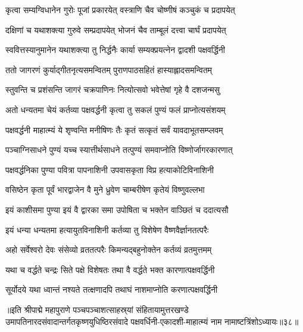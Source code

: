 \twolineshloka
{कृत्वा सम्यग्विधानेन गुरोः पूजां प्रकारयेत्}
{वस्त्राणि चैव चोष्णीषं कञ्चुकं च प्रदापयेत्}%

\twolineshloka
{दक्षिणां च यथाशक्त्या गुरुवे सम्प्रदापयेत् }
{भोजनं चैव ताम्बूलं दत्त्वा चार्घं प्रदापयेत्}%

\twolineshloka
{स्ववित्तस्यानुमानेन यथाशक्त्या तु निर्द्धनैः}
{कार्या सम्यक्प्रयत्नेन द्वादशी पक्षवर्द्धिनी}%

\twolineshloka
{ततो जागरणं कुर्याद्गीतनृत्यसमन्वितम्}
{पुराणपाठसहितं हास्याह्लादसमन्वितम्}%

\twolineshloka
{स्तुवन्ति च प्रशंसन्ति जागरं चक्रपाणिनः}
{नित्योत्सवो भवेत्तेषां गृहे वै दशजन्मसु}%

\twolineshloka
{अतो धन्यतमा चेयं कर्तव्या पक्षवर्द्धनी}
{कृत्वा तु सकलं पुण्यं फलं प्राप्नोत्यसंशयम्}%

\twolineshloka
{पक्षवर्द्धनी माहात्म्यं ये शृण्वन्ति मनीषिणः}
{तैः कृतं सत्कृतं सर्वं यावदाभूतसम्प्लवम्}%

\twolineshloka
{पञ्चाग्निसाधने पुण्यं यच्च स्यात्तीर्थसाधने}
{तत्पुण्यं समवाप्नोति विष्णोर्जागरकारणात्}%

\twolineshloka
{पक्षवर्द्धनिका पुण्या पवित्रा पापनाशिनी}
{उपवासकृता विप्र हत्याकोटिविनाशिनी}%

\twolineshloka
{वसिष्ठेन कृता पूर्वं भारद्वाजेन वै मुने}
{ध्रुवेण चाम्बरीषेण कृतेयं विष्णुवल्लभा}%

\twolineshloka
{इयं काशीसमा पुण्या इयं वै द्वारका समा}
{उपोषिता च भक्तेन वाञ्छितं च ददात्यसौ}%

\twolineshloka
{इयं धन्या धन्यतमा हत्यायुतविनाशिनी}
{कर्तव्या तु विशेषेण वैष्णवैर्ज्ञानतत्परैः}%

\twolineshloka
{अहो सर्वेश्वरो देवः संसेव्यो व्रततत्परैः}
{किमन्यद्बहुनोक्तेन कर्तव्यं व्रतमुत्तमम्}%

\twolineshloka
{यथा च वर्द्धते चन्द्रः सिते पक्षे विशेषतः}
{तथा वै वर्द्धते भक्त कारणात्पक्षवर्द्धिनी}%

\twolineshloka
{सूर्योदये यथा ध्वान्तं नश्यते तत्क्षणादपि}
{तथाघं नाशमाप्नोति करणात्पक्षवर्द्धिनी}%

॥इति श्रीपाद्मे महापुराणे पञ्चपञ्चाशत्साहस्र्यां संहितायामुत्तरखण्डे उमापतिनारदसंवादान्तर्गतकृष्णयुधिष्ठिरसंवादे पक्षवर्धिनी-एकादशी-माहात्म्यं नाम नामाष्टत्रिंशोऽध्यायः॥३८॥


\hyperref[sec:ekadashi_mahatmyam_padma_puranam]{\closesub}
\clearpage

\label{sec:padma-jagaranamahima}


